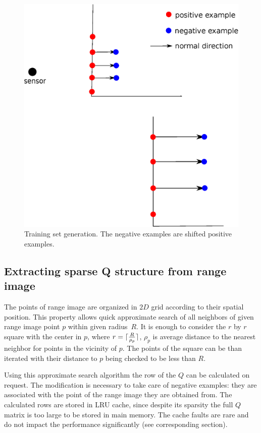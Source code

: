 \begin{figure}
\centering
\includegraphics[scale=0.5]{training_set.eps}
\caption{Training set generation. The negative examples are shifted positive examples.}
\label{tset}
\end{figure}

\subsection{Extracting sparse Q structure from range image}
The points of range image are organized in $2D$ grid according to their spatial position. This property allows quick approximate search of all neighbors of given range image point $p$ within given radius~$R$. It is enough to consider the $r$ by $r$ square with the center in $p$, where $r=\lceil \frac{R}{\rho_{p}} \rceil$, $\rho_{p}$ is average distance to the nearest neighbor for points in the vicinity of $p$. The points of the square can be than iterated with their distance to $p$ being checked to be less than $R$.

Using this approximate search algorithm the row of the $Q$ can be calculated on request. The modification is necessary to take care of negative examples: they are associated with the point of the range image they are obtained from. The calculated rows are stored in LRU cache, since despite its sparsity the full $Q$ matrix is too large to be stored in main memory. The cache faults are rare and do not impact the performance significantly (see corresponding section).

